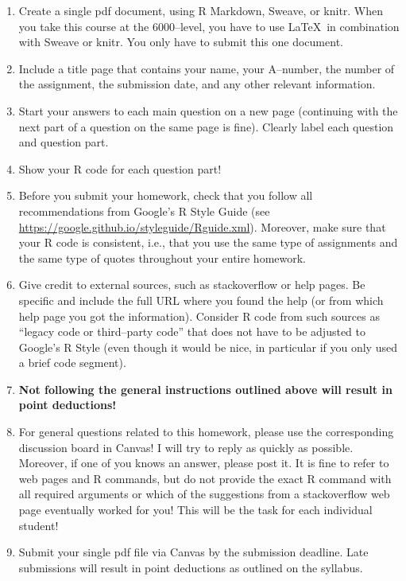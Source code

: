 \documentclass[12pt,letterpaper,final]{article}
\begin{document}
\begin{enumerate}
\item Create a single pdf document, using R Markdown, Sweave, or knitr.
When you take this course at the 6000--level, you have to use \LaTeX\ in
combination with Sweave or knitr.
You only have to submit this one document.

\item Include a title page that contains your name, your A--number, the number of
the assignment, the submission date, and any other relevant information.

\item Start your answers to each main question on a new page (continuing with the next
part of a question on the same page is fine). 
Clearly label each question and question part.

\item Show your R code for each question part!

\item Before you submit your homework, check that you
follow all recommendations from Google's R Style Guide
(see \url{https://google.github.io/styleguide/Rguide.xml}). 
Moreover, make sure that your R code is consistent, i.e., that you use the same
type of assignments and the same type of quotes throughout your entire homework.

\item Give credit to external sources, such as stackoverflow or help pages. Be specific
and include the full URL where you found the help (or from which help page you got 
the information). Consider R code from such sources as ``legacy code or third--party code'' 
that does not have to be adjusted to Google's R Style (even though it would be nice,
in particular if you only used a brief code segment).

\item {\bf Not following the general instructions outlined above will result in point deductions!}

\item For general questions related to this homework, please
use the corresponding discussion board in Canvas! I will try to
reply as quickly as possible. Moreover, if one of you knows
an answer, please post it. It is fine to refer to web pages
and R commands, but do not provide the exact R command with all required arguments
or which of the suggestions from a stackoverflow web page eventually worked for you! 
This will be the task for each individual student!

\item Submit your single pdf file via Canvas by the submission deadline.
Late submissions will result in point deductions as outlined on the syllabus.

\end{enumerate}
\end{document}
